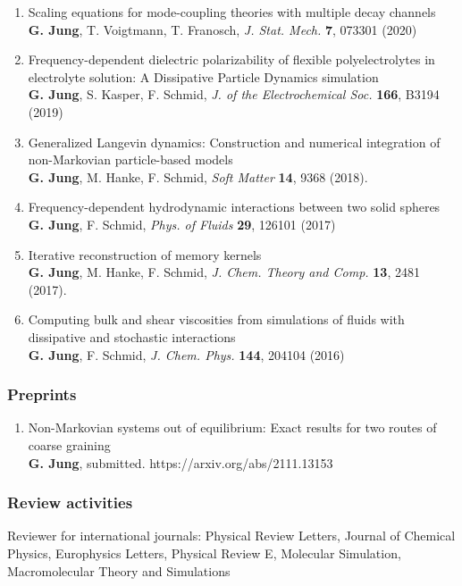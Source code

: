 \begin{enumerate}
	\item Scaling equations for mode-coupling theories with multiple decay channels\\
	\textbf{G. Jung}, T. Voigtmann, T. Franosch, \emph{J. Stat. Mech.} \textbf{7}, 073301 (2020)
	\item Frequency-dependent dielectric polarizability of flexible polyelectrolytes in electrolyte solution: A Dissipative Particle Dynamics simulation \\
	\textbf{G. Jung}, S. Kasper, F. Schmid, \emph{J. of the Electrochemical Soc.} \textbf{166}, B3194 (2019)
	\item Generalized Langevin dynamics: Construction and numerical integration of non-Markovian particle-based models\\
\textbf{	G. Jung}, M. Hanke, F. Schmid, \emph{Soft Matter} \textbf{14}, 9368 (2018).
	\item Frequency-dependent hydrodynamic interactions between two solid spheres\\
	\textbf{G. Jung}, F. Schmid, \emph{Phys. of Fluids} \textbf{29}, 126101 (2017)
	\item Iterative reconstruction of memory kernels  \\
	\textbf{G. Jung}, M. Hanke, F. Schmid, \emph{J. Chem. Theory and Comp.} \textbf{13}, 2481 (2017).
	\item Computing bulk and shear viscosities from simulations of fluids with dissipative and stochastic interactions\\
\textbf{	G. Jung}, F. Schmid, \emph{J. Chem. Phys.} \textbf{144}, 204104 (2016)
\end{enumerate}



\subsubsection*{Preprints}

\begin{enumerate}
		\item Non-Markovian systems out of equilibrium: Exact results for two routes of coarse graining\\
		\textbf{G. Jung}, submitted. https://arxiv.org/abs/2111.13153
\end{enumerate}

\subsubsection*{Review activities}
 Reviewer for international journals: Physical Review Letters, Journal of Chemical Physics, Europhysics Letters, Physical Review E, Molecular Simulation, Macromolecular Theory and Simulations


